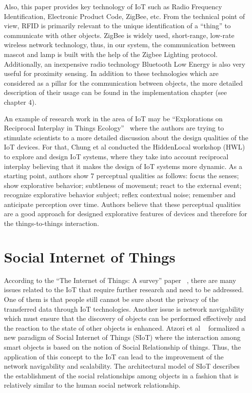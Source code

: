 Also, this paper provides key technology of IoT such as Radio Frequency Identification,
Electronic Product Code, ZigBee, etc.
From the technical point of view, RFID is primarily relevant to the unique identification of
a “thing” to communicate with other objects.
ZigBee is widely used, short-range, low-rate wireless network technology, thus, in our
system, the communication between mascot and lamp is built with the help of the Zigbee Lighting protocol.
Additionally, an inexpensive radio technology Bluetooth Low Energy is also very useful for proximity sensing.
In addition to these technologies which are considered as a pillar for the communication between
objects, the more detailed description of their usage can be found in the implementation chapter (see chapter 4).

An example of research work in the area of IoT may be “Explorations on Reciprocal
Interplay in Things Ecology”~\cite{chung2018explorations} where the authors are trying to
stimulate scientists to a more detailed discussion about the design qualities of the IoT devices.
For that, Chung et al conducted the HiddenLocal workshop (HWL) to explore and design
IoT systems, where they take into account reciprocal interplay believing that it makes the
design of IoT systems more dynamic.
As a starting point, authors show 7 perceptual qualities as follows: focus the senses;
show explorative behavior;
subtleness of movement;
react to the external event;
recognize explorative behavior subject;
reflex contextual noise;
remember and anticipate perception over time.
Authors believe that these perceptual qualities are a good approach for designed explorative
features of devices and therefore for the things-to-things interaction.

\section{Social Internet of Things}
\label{sec:Social Internet of Things}
According to the “The Internet of Things: A survey” paper ~\cite{atzori2010internet},
there are many issues related to the IoT that require further
research and need to be addressed.
One of them is that people still cannot be sure about the privacy of the transferred data
through IoT technologies.
Another issue is network navigability which must ensure that the discovery of objects can be
performed effectively and the reaction to the state of other objects is enhanced.
Atzori et al ~\cite{atzori2011siot} formalized a new paradigm of Social Internet of Things (SIoT)
where the interaction among smart objects is based on the notion of Social Relationship of things.
Thus, the application of this concept to the IoT can lead to the improvement
of the network navigability and scalability.
The architectural model of SIoT describes the establishment of the social relationships
among objects in a fashion that is relatively similar to the human social network relationship.

